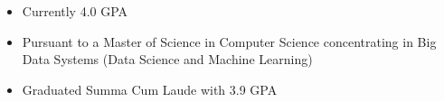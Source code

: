 \begin{itemize}
  \item Currently 4.0 GPA
  \item Pursuant to a Master of Science in Computer Science concentrating in Big Data
        Systems (Data Science and Machine Learning)
\end{itemize}
\divider
{}
\begin{itemize}
  \item  Graduated Summa Cum Laude with 3.9 GPA
\end{itemize}
